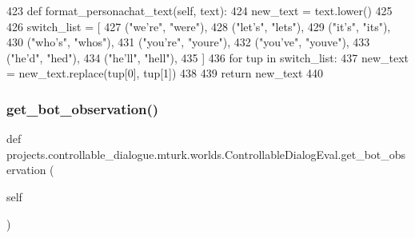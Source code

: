 \begin{DoxyCode}
423     \textcolor{keyword}{def }format\_personachat\_text(self, text):
424         new\_text = text.lower()
425 
426         switch\_list = [
427             (\textcolor{stringliteral}{"we're"}, \textcolor{stringliteral}{"were"}),
428             (\textcolor{stringliteral}{"let's"}, \textcolor{stringliteral}{"lets"}),
429             (\textcolor{stringliteral}{"it's"}, \textcolor{stringliteral}{"its"}),
430             (\textcolor{stringliteral}{"who's"}, \textcolor{stringliteral}{"whos"}),
431             (\textcolor{stringliteral}{"you're"}, \textcolor{stringliteral}{"youre"}),
432             (\textcolor{stringliteral}{"you've"}, \textcolor{stringliteral}{"youve"}),
433             (\textcolor{stringliteral}{"he'd"}, \textcolor{stringliteral}{"hed"}),
434             (\textcolor{stringliteral}{"he'll"}, \textcolor{stringliteral}{"hell"}),
435         ]
436         \textcolor{keywordflow}{for} tup \textcolor{keywordflow}{in} switch\_list:
437             new\_text = new\_text.replace(tup[0], tup[1])
438 
439         \textcolor{keywordflow}{return} new\_text
440 
\end{DoxyCode}
\mbox{\label{classprojects_1_1controllable__dialogue_1_1mturk_1_1worlds_1_1ControllableDialogEval_aa5b2e18bf75fe4ae814672951ecc6e1d}} 
\subsubsection{\texorpdfstring{get\+\_\+bot\+\_\+observation()}{get\_bot\_observation()}}
{\footnotesize\ttfamily def projects.\+controllable\+\_\+dialogue.\+mturk.\+worlds.\+Controllable\+Dialog\+Eval.\+get\+\_\+bot\+\_\+observation (\begin{DoxyParamCaption}\item[{}]{self }\end{DoxyParamCaption})}



